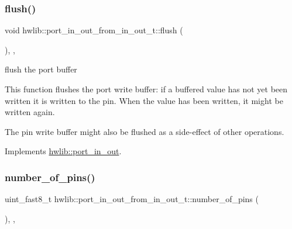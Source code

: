 \mbox{\label{classhwlib_1_1port__in__out__from__in__out__t_a7ae629f8dc18f39975494b5f370551b2}} 
\subsubsection{\texorpdfstring{flush()}{flush()}}
{\footnotesize\ttfamily void hwlib\+::port\+\_\+in\+\_\+out\+\_\+from\+\_\+in\+\_\+out\+\_\+t\+::flush (\begin{DoxyParamCaption}{ }\end{DoxyParamCaption})\hspace{0.3cm}{\ttfamily [inline]}, {\ttfamily [override]}, {\ttfamily [virtual]}}

flush the port buffer

This function flushes the port write buffer\+: if a buffered value has not yet been written it is written to the pin. When the value has been written, it might be written again.

The pin write buffer might also be flushed as a side-\/effect of other operations. 

Implements \hyperlink{classhwlib_1_1port__in__out_a164564bcd08c137f0ff2e6445e9cfe5e}{hwlib\+::port\+\_\+in\+\_\+out}.

\mbox{\label{classhwlib_1_1port__in__out__from__in__out__t_a07646684024952afc6c166142f0d181b}} 
\subsubsection{\texorpdfstring{number\+\_\+of\+\_\+pins()}{number\_of\_pins()}}
{\footnotesize\ttfamily uint\+\_\+fast8\+\_\+t hwlib\+::port\+\_\+in\+\_\+out\+\_\+from\+\_\+in\+\_\+out\+\_\+t\+::number\+\_\+of\+\_\+pins (\begin{DoxyParamCaption}{ }\end{DoxyParamCaption})\hspace{0.3cm}{\ttfamily [inline]}, {\ttfamily [override]}, {\ttfamily [virtual]}}

